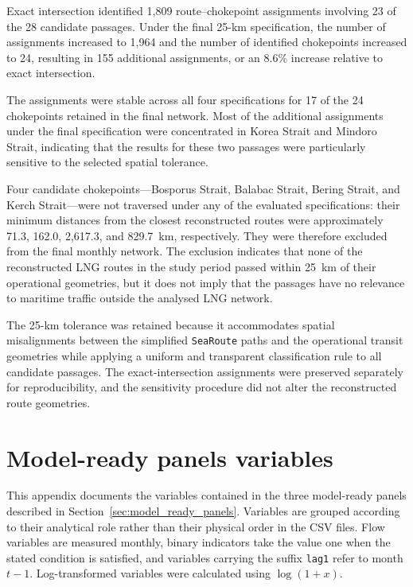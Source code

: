 \documentclass[pdftex,12pt,openright,a4paper,oneside]{book}
\begin{document}
Exact intersection identified 1,809 route--chokepoint assignments involving
23 of the 28 candidate passages. Under the final 25-km specification, the
number of assignments increased to 1,964 and the number of identified
chokepoints increased to 24, resulting in 155 additional assignments, or
an 8.6\% increase relative to exact intersection.

The assignments were stable across all four specifications for 17 of the 24 chokepoints retained in the final network. 
Most of the additional assignments under the final specification were concentrated in Korea Strait and Mindoro Strait, indicating that the results for these two passages were particularly sensitive to the selected spatial tolerance.

Four candidate chokepoints---Bosporus Strait, Balabac Strait, Bering Strait,
and Kerch Strait---were not traversed under any of the evaluated
specifications: their minimum distances from the closest reconstructed routes
were approximately 71.3, 162.0, 2,617.3, and 829.7~km, respectively. They were
therefore excluded from the final monthly network. The exclusion indicates
that none of the reconstructed LNG routes in the study period passed within
25~km of their operational geometries, but it does not imply that the passages
have no relevance to maritime traffic outside the analysed LNG network.

The 25-km tolerance was retained because it accommodates spatial
misalignments between the simplified \texttt{SeaRoute} paths and the
operational transit geometries while applying a uniform and transparent
classification rule to all candidate passages. The exact-intersection
assignments were preserved separately for reproducibility, and the sensitivity
procedure did not alter the reconstructed route geometries.


\chapter{Model-ready panels variables}
\label{app:model_ready_variables}

This appendix documents the variables contained in the three model-ready panels described in Section~\ref{sec:model_ready_panels}. 
Variables are grouped according to their analytical role rather than their physical order in the CSV files. 
Flow variables are measured monthly, binary indicators take the value one when the stated condition is satisfied, and variables carrying the suffix \texttt{lag1} refer to month \(t-1\).
Log-transformed variables were calculated using \(\log(1+x)\).
\end{document}
